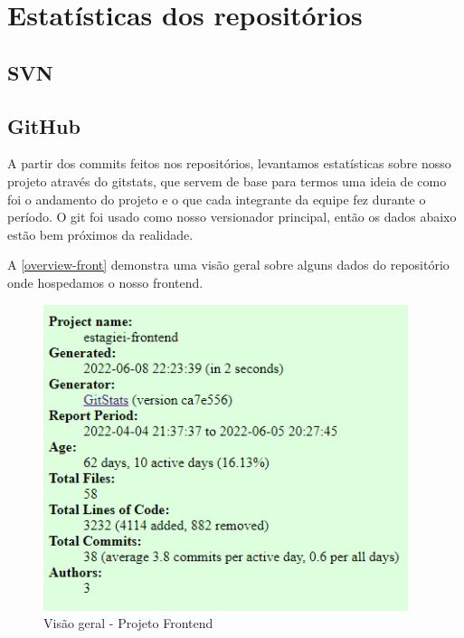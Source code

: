 \section{Estatísticas dos repositórios}

\subsection{SVN}

\subsection{GitHub}
A partir dos commits feitos nos repositórios, levantamos estatísticas sobre nosso projeto através do \gls{gitstats}, que servem de base para termos uma ideia de como foi o andamento do projeto e o que cada integrante da equipe fez durante o período.
O \gls{git} foi usado como nosso versionador principal, então os dados abaixo estão bem próximos da realidade.

A \autoref{overview-front} demonstra uma visão geral sobre alguns dados do repositório onde hospedamos o nosso frontend.
\begin{figure}[H]
	\centering
	\caption{\label{overview-front}Visão geral - Projeto Frontend}
	\includegraphics[width=0.95\textwidth]{../imagens/stats/overview-frontend.png}
\end{figure}


